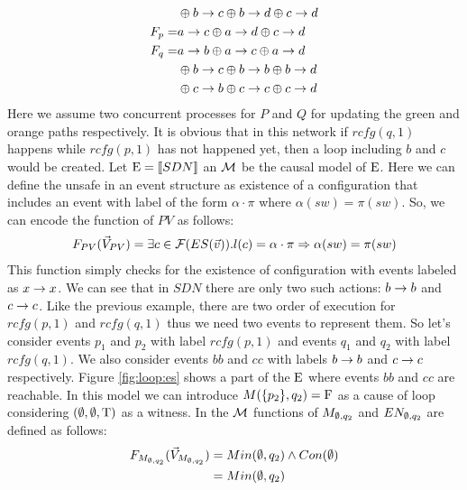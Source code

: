 \begin{example}
\begin{equation*}
\begin{aligned}
                   & \oplus b\rightarrow c \oplus b\rightarrow d \oplus c\rightarrow d        \\
            F_p  = & a\rightarrow c \oplus a\rightarrow d \oplus c\rightarrow d               \\
            F_q  = & a\rightarrow b \oplus a\rightarrow c \oplus a\rightarrow d               \\
                   & \oplus b\rightarrow c \oplus b\rightarrow b \oplus b\rightarrow d        \\
                   & \oplus        c\rightarrow b \oplus c\rightarrow c \oplus c\rightarrow d
        \end{aligned}
    \end{equation*}
    Here we assume two concurrent processes for $P$ and $Q$ for updating
    the green and orange paths respectively.
    It is obvious that in this network if $rcfg(q,1)$ happens while
    $rcfg(p,1)$ has not happened yet, then a loop including
    $b$ and $c$ would be created.
    Let $\mathrm{E} = \llbracket SDN \rrbracket$ an $\mathcal{M}$ be the causal model of $\mathrm{E}$.
    Here we can define the unsafe in an event structure as existence of
    a configuration that includes an event with label of the form
    $\alpha\cdot\pi$ where $\alpha(sw) = \pi(sw)$.
    So, we can encode the function of $PV$ as follows:
    \begin{align*}
        F_{PV}(\vec V_{PV}) = \exists c \in \mathcal{F}(ES(\vec v)).
        l(c) = \alpha\cdot\pi \Rightarrow \alpha(sw) = \pi(sw)
    \end{align*}
    This function simply checks for the existence of configuration with
    events labeled as $x \rightarrow x$.
    We can see that in $SDN$ there are only two such actions:
    $b\rightarrow b$ and $c\rightarrow c$.
    Like the previous example, there are two order of execution for
    $rcfg(p,1)$ and $rcfg(q,1)$ thus we need two events to represent
    them.
    So let's consider events $p_1$ and $p_2$ with label $rcfg(p,1)$
    and events $q_1$ and $q_2$ with label $rcfg(q,1)$.
    We also consider events $bb$ and $cc$ with labels
    $b \rightarrow b$ and $c\rightarrow c$ respectively.
    Figure \ref{fig:loop:es} shows a part of the $\mathrm{E}$ where
    events $bb$ and $cc$ are reachable.
    In this model we can introduce $M(\{p_2\},q_2) = \mathrm{F}$ as a cause
    of loop considering $(\emptyset,\emptyset,\mathrm{T})$ as a witness.
    In the $\mathcal{M}$ functions of $M_{\emptyset,q_2}$ and $EN_{\emptyset,q_2}$ are
    defined as follows:
    \begin{align*}
        \f{M_{\e,q_2}}  & = Min(\e,q_2) \wedge Con(\e) \\
                        & = Min(\e,q_2)                \\

\end{align*}
\end{example}
